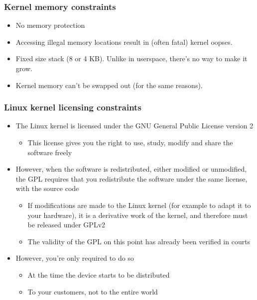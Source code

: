 \begin{frame}
  \frametitle{Kernel memory constraints}
  \begin{itemize}
  \item No memory protection
  \item Accessing illegal memory locations result in (often fatal)
    kernel oopses.
  \item Fixed size stack (8 or 4 KB). Unlike in userspace, there's no
    way to make it grow.
  \item Kernel memory can't be swapped out (for the same reasons).
  \end{itemize}
\end{frame}

\begin{frame}
  \frametitle{Linux kernel licensing constraints}
  \begin{itemize}
  \item The Linux kernel is licensed under the GNU General Public
    License version 2
    \begin{itemize}
    \item This license gives you the right to use, study, modify and
      share the software freely
    \end{itemize}
  \item However, when the software is redistributed, either modified
    or unmodified, the GPL requires that you redistribute the software
    under the same license, with the source code
    \begin{itemize}
    \item If modifications are made to the Linux kernel (for example
      to adapt it to your hardware), it is a derivative work of the
      kernel, and therefore must be released under GPLv2
    \item The validity of the GPL on this point has already been
      verified in courts
    \end{itemize}
  \item However, you're only required to do so
    \begin{itemize}
    \item At the time the device starts to be distributed
    \item To your customers, not to the entire world
    \end{itemize}
  \end{itemize}
\end{frame}

